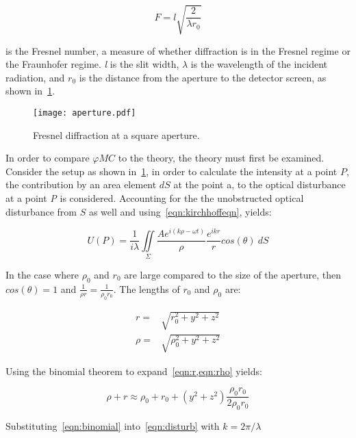 \begin{equation}
F = l\sqrt{\frac{2}{\lambda r_0}}
\label{eqn:fnumber}
\end{equation}

 is the Fresnel number, a measure of whether diffraction is in the Fresnel regime or the Fraunhofer regime.
\textit{l} is the slit width, $\lambda$ is the wavelength of the incident radiation, and $r_0$ is the distance from the aperture to the detector screen, as shown in~\cref{fig:aperture}. 

\medskip
\begin{figure}[!ht]
    \centering
    \texttt{[image: aperture.pdf]}
    \caption{Fresnel diffraction at a square aperture.}
    \label{fig:aperture}
\end{figure}

In order to compare $\varphi MC$ to the theory, the theory must first be examined.
Consider the setup as shown in~\cref{fig:aperture}, in order to calculate the intensity at a point $P$, the contribution by an area element $dS$ at the point a, to the optical disturbance at a point \textit{P} is considered.
Accounting for the the unobstructed optical disturbance from $S$ as well and using~\cref{eqn:kirchhoffeqn}, yields: 


\begin{equation}
U(P)=\frac{1}{i\lambda}\iint\limits_{\Sigma} \frac{Ae^{i(k\rho-\omega t)}}{\rho} \frac{e^{ikr}}{r}cos(\theta)\ dS
\label{eqn:disturb}
\end{equation}


In the case where $\rho_0$ and $r_0$ are large compared to the size of the aperture, then $cos(\theta) = 1$ and $\tfrac{1}{\rho r}=\tfrac{1}{\rho_0 r_0}$.
The lengths of $r_0$ and $\rho_0$ are:

\begin{align}
r=&\sqrt{r_0^2+y^2+z^2}\label{eqn:r} \\
\rho=&\sqrt{\rho_0^2+y^2+z^2}\label{eqn:rho}
\end{align}

Using the binomial theorem to expand~\cref{eqn:r,eqn:rho} yields:

\begin{equation}
\rho + r \approx \rho_0 + r_0 + (y^2+z^2)\frac{\rho_0r_0}{2\rho_0r_0}
\label{eqn:binomial}
\end{equation}

Substituting~\cref{eqn:binomial} into~\cref{eqn:disturb} with $k=2\pi/\lambda$

